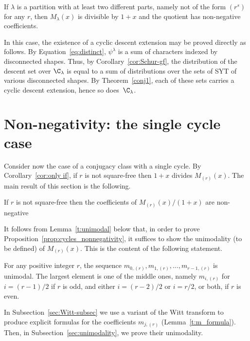 \begin{corollary}
    If $\lambda$ is a partition with at least two different parts, namely not of the form $(r^s)$ for any $r$, 
    then $M_\lambda(x)$ is divisible by $1+x$ and the quotient has non-negative coefficients.
\end{corollary}

\begin{remark}\label{rem:distinct} 
    In this case, the existence of a cyclic descent extension
    may be proved directly as follows.
    By Equation~\eqref{eq:distinct}, $\psi^\lambda$ is a sum of characters indexed by disconnected shapes. 
    Thus, by 
    Corollary~\ref{cor:Schur-gf}, the distribution of the descent set over $\C_\lambda$ is equal to a sum of distributions over the sets of SYT of various disconnected shapes.
    By Theorem~\ref{conj1}, each of these sets carries a cyclic descent extension, hence so does~$\C_\lambda$.
\end{remark}


\section{Non-negativity: the single cycle case}
\label{sec:cycles}

Consider now the case of a conjugacy class with a single cycle.
By Corollary~\ref{cor:only if}, if $r$ is not square-free then $1+x$ divides $M_{(r)}(x)$. 
The main result of this section is the following. 

\begin{proposition}\label{prop:cycles_nonnegativity}
    If $r$ is not square-free then the coefficients of $M_{(r)}(x)/(1+x)$ are non-negative
\end{proposition}
		
It follows from Lemma~\ref{t:unimodal} below that, in order to prove Proposition~\ref{prop:cycles_nonnegativity}, it suffices to show the unimodality (to be defined) of $M_{(r)}(x)$. This is the content of the following statement.
		 
\begin{proposition}\label{prop:s=1_unimodal}
    For any positive integer $r$, the sequence $m_{0,(r)}, m_{1,(r)},\ldots, m_{r-1,(r)}$ is unimodal.
    The largest element is one of the middle ones, namely $m_{i,(r)}$ for $i = (r-1)/2$ if $r$ is odd, and either $i = (r-2)/2$ or $i = r/2$, or both, if $r$ is even.
\end{proposition}

In Subsection~\ref{sec:Witt-subsec} we use a variant of the Witt transform to produce explicit formulas for the coefficients $m_{j,(r)}$ (Lemma~\ref{t:m_formula}).
Then, in Subsection~\ref{sec:unimodality}, we prove their unimodality.


